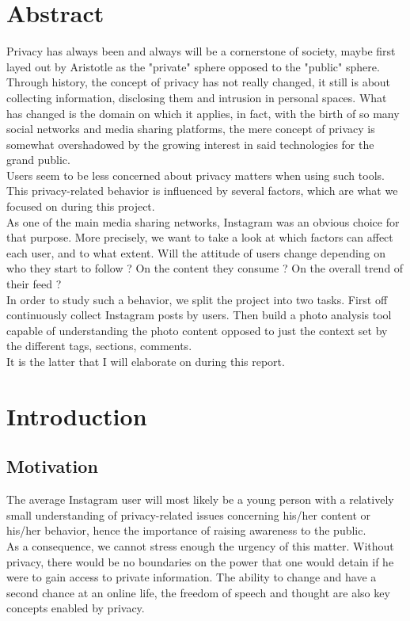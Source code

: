 \documentclass{article}
\begin{document}
\newpage
\tableofcontents

\newpage
\section{Abstract}
    Privacy has always been and always will be a cornerstone of society, maybe first layed out by Aristotle as the "private" sphere opposed to the "public" sphere. 
    \\Through history, the concept of privacy has not really changed, it still is about collecting information, disclosing them and intrusion in personal spaces. What has changed is the domain on which it applies, in fact, with the birth of so many social networks and media sharing platforms, the mere concept of privacy is somewhat overshadowed by the growing interest in said technologies for the grand public.
    \\Users seem to be less concerned about privacy matters when using such tools. This privacy-related behavior is influenced by several factors, which are what we focused on during this project.
    \\As one of the main media sharing networks, Instagram was an obvious choice for that purpose. More precisely, we want to take a look at which factors can affect each user, and to what extent. Will the attitude of users change depending on who they start to follow ? On the content they consume ? On the overall trend of their feed ?
    \\In order to study such a behavior, we split the project into two tasks. First off continuously collect Instagram posts by users. Then build a photo analysis tool capable of understanding the photo content opposed to just the context set by the different tags, sections, comments.
    \\It is the latter that I will elaborate on during this report.

\newpage
\section{Introduction}
    \subsection{Motivation}
        The average Instagram user will most likely be a young person with a relatively small understanding of privacy-related issues concerning his/her content or his/her behavior, hence the importance of raising awareness to the public. 
        \\As a consequence, we cannot stress enough the urgency of this matter. Without privacy, there would be no boundaries on the power that one would detain if he were to gain access to private information. The ability to change and have a second chance at an online life, the freedom of speech and thought are also key concepts enabled by privacy.
\end{document}
